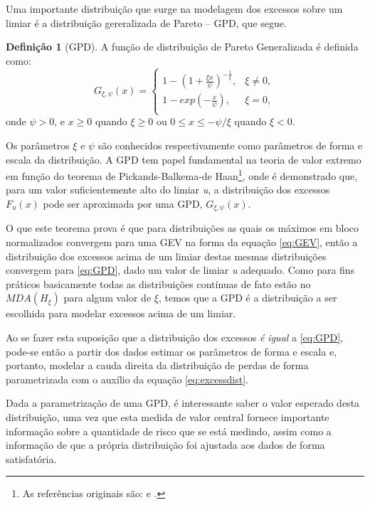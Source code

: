 \documentclass[1p]{elsarticle}
\theoremstyle{definition}
\newtheorem{defi}[teor]{Definição}
\begin{document}
Uma importante distribuição que surge na modelagem dos excessos sobre um limiar é a distribuição gereralizada de Pareto – GPD, que segue.

\begin{defi}[GPD] \label{defi:GPD}
	A função de distribuição de Pareto Generalizada é definida como:
	\begin{equation}
	\label{eq:GPD}
	G_{\xi,\psi}(x) = 
	\begin{cases}
	1- \left(1+ \frac{\xi x}{\psi} \right)^{-\frac{1}{\xi}}, & \xi \neq 0,\\
	1-exp\left(-\frac{x}{\psi}\right), & \xi = 0,\\
	\end{cases}
	\end{equation}
	onde $\psi > 0$, e $x\geq 0$ quando $\xi  \geq 0$ ou $0 \leq x \leq -\psi / \xi$ quando $\xi < 0$.
\end{defi}

Os parâmetros $\xi$ e $\psi$ são conhecidos respectivamente como parâmetros de forma e escala da distribuição. A GPD tem papel fundamental na teoria de valor extremo em função do teorema de Pickands-Balkema-de Haan\footnote{As referências originais são: \cite{Pickands1975} e \cite{Balkema1974}.}, onde é demonstrado que, para um valor suficientemente alto do limiar \emph{u}, a distribuição dos excessos $F_u(x)$ pode ser aproximada por uma GPD, $G_{\xi,\psi}(x)$.

O que este teorema prova é que para distribuições as quais os máximos em bloco normalizados convergem para uma GEV na forma da equação \eqref{eq:GEV}, então a distribuição dos excessos acima de um limiar destas mesmas distribuições convergem para \eqref{eq:GPD}, dado um valor de limiar \emph{u} adequado. Como para fins práticos basicamente todas as distribuições contínuas de fato estão no $MDA(H_\xi)$ para algum valor de $\xi$, temos que a GPD é a distribuição a ser escolhida para modelar excessos acima de um limiar.

Ao se fazer esta suposição que a distribuição dos excessos \emph{é igual} a \eqref{eq:GPD}, pode-se então a partir dos dados estimar os parâmetros de forma e escala e, portanto, modelar a cauda direita da distribuição de perdas de forma parametrizada com o auxílio da equação \eqref{eq:excessdist}. 


Dada a parametrização de uma GPD, é interessante saber o valor esperado desta distribuição, uma vez que esta medida de valor central fornece importante informação sobre a quantidade de risco que se está medindo, assim como a informação de que a própria distribuição foi ajustada aos dados de forma satisfatória.
\end{document}
